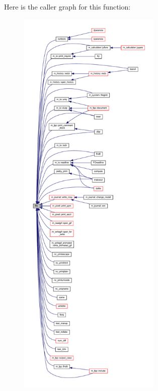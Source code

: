 Here is the caller graph for this function\+:
\nopagebreak
\begin{figure}[H]
\begin{center}
\leavevmode
\includegraphics[height=550pt]{what__overview_81_8txt_a447b56c526e8da30e0dc94673727ee25_icgraph}
\end{center}
\end{figure}
\mbox{\label{what__overview_81_8txt_ab6ccd3cf736f24d661599d9ce944e9bf}} 

